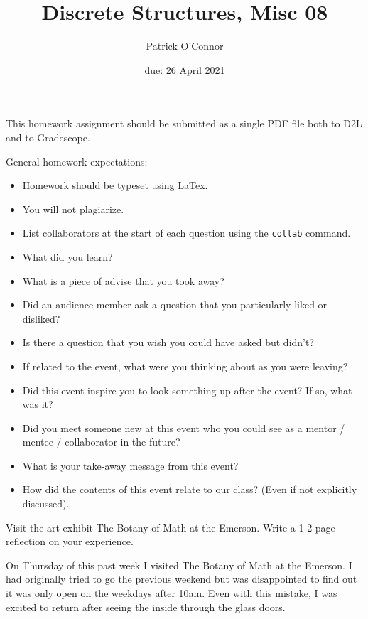 \documentclass{article}
\title{Discrete Structures, Misc 08}
\author{Patrick O'Connor}
\date{due: 26 April 2021}
\begin{document}
\maketitle

This homework assignment should be
submitted as a single PDF file both to D2L and to Gradescope.

General homework expectations:
\begin{itemize}
    \item Homework should be typeset using LaTex.
    \item You will not plagiarize.
    \item List collaborators at the start of each question using the
        \texttt{collab} command.
    \item What did you learn?
    \item     What is a piece of advise that you took away?
    \item     Did an audience member ask a question that you particularly liked or disliked?
    \item    Is there a question that you wish you could have asked but didn't?
    \item     If related to the event, what were you thinking about as you were leaving?
    \item   Did this event inspire you to look something up after the event? If so, what was it?
    \item    Did you meet someone new at this event who you could see as a mentor / mentee / collaborator in the future?
    \item     What is your take-away message from this event?
    \item    How did the contents of this event relate to our class? (Even if not explicitly discussed).
\end{itemize}


Visit the art exhibit The Botany of Math at the Emerson. Write a 1-2 page reflection on your experience.

On Thursday of this past week I visited The Botany of Math at the Emerson. I had originally tried to go the previous weekend 
but was disappointed to find out it was only open on the weekdays after 10am. Even with this mistake, I was excited to 
return after seeing the inside through the glass doors. 
\end{document}
